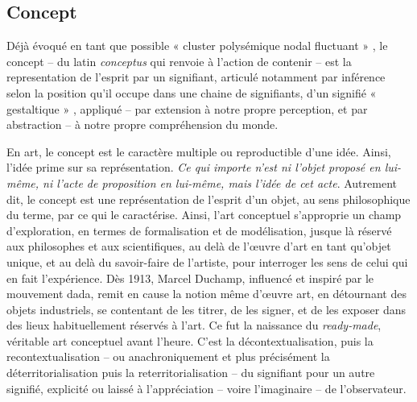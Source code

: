 \documentclass{article}
\begin{document}


\subsection*{Concept} %

Déjà évoqué en tant que possible « cluster polysémique nodal fluctuant »%
, le concept -- du latin \textit{conceptus} qui renvoie à l'action de contenir -- est la representation de l'esprit par un signifiant, articulé notamment par inférence selon la position qu’il occupe dans une chaine de signifiants, d'un signifié « gestaltique »%
, appliqué -- par extension à notre propre perception, et par abstraction -- à notre propre compréhension du monde. 

\bigskip 

En art, le concept est le caractère multiple ou reproductible d'une idée. Ainsi, l'idée prime sur sa représentation. \textit{Ce qui importe n’est ni l’objet proposé en lui-même, ni l’acte de proposition en lui-même, mais l’idée de cet acte}. Autrement dit, le concept est une représentation de l’esprit d’un objet, au sens philosophique du terme, par ce qui le caractérise.
Ainsi, l'art conceptuel s'approprie un champ d'exploration, en termes de formalisation et de modélisation, jusque là réservé aux philosophes et aux scientifiques, au delà de l'œuvre d'art en tant qu'objet unique, et au delà du savoir-faire de l'artiste, pour interroger les sens de celui qui en fait l'expérience.
Dès 1913, Marcel Duchamp, influencé et inspiré par le mouvement dada, remit en cause la notion même d'œuvre art, en détournant des objets industriels, se contentant de les titrer, de les signer, et de les exposer dans des lieux habituellement réservés à l'art. Ce fut la naissance du \textit{ready-made}, véritable art conceptuel avant l'heure. C'est la décontextualisation, puis la recontextualisation -- ou anachroniquement et plus précisément la déterritorialisation puis la reterritorialisation -- du signifiant pour un autre signifié, explicité ou laissé à l'appréciation -- voire l'imaginaire -- de l'observateur. 
\end{document}
